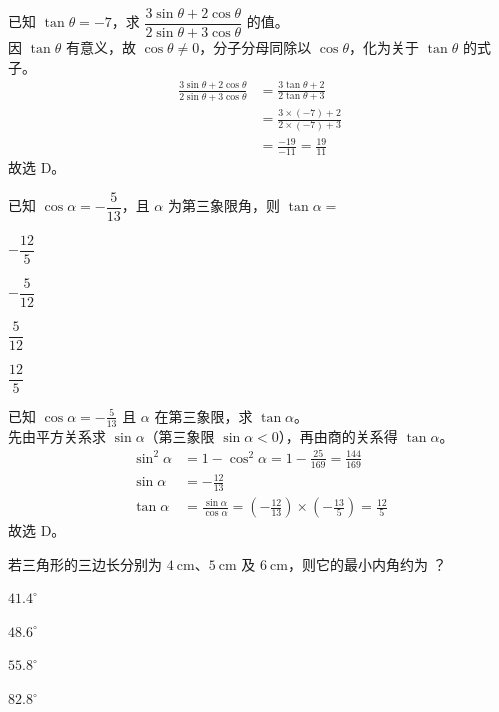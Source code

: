 \documentclass[12pt,a4paper,fontset=none]{exam-zh}
\begin{document}
\begin{solution}
    已知 $\tan\theta=-7$，求 $\dfrac{3\sin\theta+2\cos\theta}{2\sin\theta+3\cos\theta}$ 的值。 \\
    因 $\tan\theta$ 有意义，故 $\cos\theta\neq0$，分子分母同除以 $\cos\theta$，化为关于 $\tan\theta$ 的式子。 \\
    \begin{align*}
        \frac{3\sin\theta+2\cos\theta}{2\sin\theta+3\cos\theta} &= \frac{3\tan\theta+2}{2\tan\theta+3} \\
        &= \frac{3\times(-7)+2}{2\times(-7)+3} \\
        &= \frac{-19}{-11} = \frac{19}{11}
    \end{align*}
    故选 D。
\end{solution}

\begin{question}
    已知 $\cos\alpha=-\dfrac{5}{13}$，且 $\alpha$ 为第三象限角，则 $\tan\alpha=$ \paren[D]
    \begin{choices}
        \item $-\dfrac{12}{5}$
        \item $-\dfrac{5}{12}$
        \item $\dfrac{5}{12}$
        \item $\dfrac{12}{5}$
    \end{choices}
\end{question}

\begin{solution}
    已知 $\cos\alpha=-\frac{5}{13}$ 且 $\alpha$ 在第三象限，求 $\tan\alpha$。 \\
    先由平方关系求 $\sin\alpha$（第三象限 $\sin\alpha<0$），再由商的关系得 $\tan\alpha$。 \\
    \begin{align*}
        \sin^2\alpha &= 1-\cos^2\alpha = 1-\frac{25}{169} = \frac{144}{169} \\
        \sin\alpha &= -\frac{12}{13} \\
        \tan\alpha &= \frac{\sin\alpha}{\cos\alpha} = \left(-\frac{12}{13}\right)\times\left(-\frac{13}{5}\right) = \frac{12}{5}
    \end{align*}
    故选 D。
\end{solution}

\begin{question}
    若三角形的三边长分别为 $4\ \mathrm{cm}$、$5\ \mathrm{cm}$ 及 $6\ \mathrm{cm}$，则它的最小内角约为 \paren[A]？
    \begin{choices}
        \item $41.4^{\circ}$
        \item $48.6^{\circ}$
        \item $55.8^{\circ}$
        \item $82.8^{\circ}$
    \end{choices}
\end{question}
\end{document}
